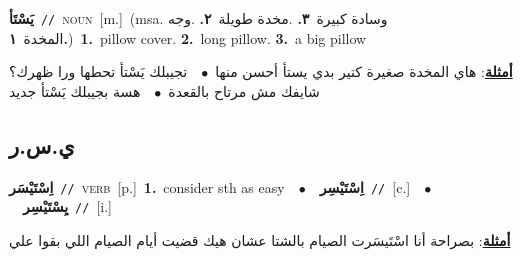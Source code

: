 \documentclass[10pt,a4paper,twoside]{article} %
\begin{document}
\begin{multicols}{2}
{\setlength\topsep{0pt}\textbf{\foreignlanguage{arabic}{يَسْتَأ}}\ {\color{gray}\texttt{//}\color{black}}\ \textsc{noun}\ [m.]\ \color{gray}(msa. \foreignlanguage{arabic}{وسادة كبيرة}~\foreignlanguage{arabic}{\textbf{٣.}}  .\foreignlanguage{arabic}{مخدة طويلة}~\foreignlanguage{arabic}{\textbf{٢.}}  .\foreignlanguage{arabic}{وجه المخدة}~\foreignlanguage{arabic}{\textbf{١.}})\color{black}\ \textbf{1.}~pillow cover.  \textbf{2.}~long pillow.  \textbf{3.}~a big pillow\  \begin{flushright}\color{gray}\foreignlanguage{arabic}{\textbf{\underline{\foreignlanguage{arabic}{أمثلة}}}: هاي المخدة صغيرة كتير بدي يستأ أحسن منها\ $\bullet$\ \  تجيبلك يَسْتأ تحطها ورا ظهرك؟ شايفك مش مرتاح بالقعدة\ $\bullet$\ \  هسة بجيبلك يَسْتأ جديد}\end{flushright}\color{black}} \vspace{2mm}

\vspace{-3mm}
\subsection*{\color{blue}\foreignlanguage{arabic}{ي.س.ر}\color{blue}{}} 

{\setlength\topsep{0pt}\textbf{\foreignlanguage{arabic}{اِسْتَيْسَر}}\ {\color{gray}\texttt{//}\color{black}}\ \textsc{verb}\ [p.]\ \textbf{1.}~consider sth as easy\ \ $\bullet$\ \ \setlength\topsep{0pt}\textbf{\foreignlanguage{arabic}{اِسْتَيْسِر}}\ {\color{gray}\texttt{//}\color{black}}\ [c.]\ \ $\bullet$\ \ \setlength\topsep{0pt}\textbf{\foreignlanguage{arabic}{يِسْتَيْسِر}}\ {\color{gray}\texttt{//}\color{black}}\ [i.]\  \begin{flushright}\color{gray}\foreignlanguage{arabic}{\textbf{\underline{\foreignlanguage{arabic}{أمثلة}}}: بصراحة أنا اسْتَيسَرت الصيام بالشتا عشان هيك قضيت أيام الصيام اللي بقوا علي}\end{flushright}\color{black}} \vspace{2mm}


\end{multicols}
\end{document}
